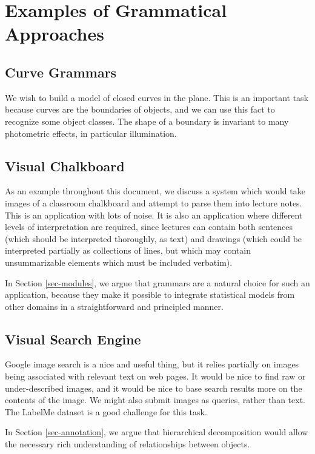 \section{Examples of Grammatical Approaches}
\label{sec-grammar-examples}

\subsection{Curve Grammars}

We wish to build a model of closed curves in the plane. This is an
important task because curves are the boundaries of objects, and we
can use this fact to recognize some object classes. The shape of a
boundary is invariant to many photometric effects, in particular
illumination. \cite{canny}

\subsection{Visual Chalkboard}

As an example throughout this document, we discuss a system which
would take images of a classroom chalkboard and attempt to parse them
into lecture notes. This is an application with lots of noise. It is
also an application where different levels of interpretation are
required, since lectures can contain both sentences (which should be
interpreted thoroughly, as text) and drawings (which could be
interpreted partially as collections of lines, but which may contain
unsummarizable elements which must be included verbatim).

In Section \ref{sec-modules}, we argue that grammars are a natural
choice for such an application, because they make it possible to
integrate statistical models from other domains in a straightforward
and principled manner.

\subsection{Visual Search Engine}

Google image search is a nice and useful thing, but it relies
partially on images being associated with relevant text on web
pages. It would be nice to find raw or under-described images, and it
would be nice to base search results more on the contents of the
image. We might also submit images as queries, rather than text. The
LabelMe dataset is a good challenge for this task.

In Section \ref{sec-annotation}, we argue that hierarchical
decomposition would allow the necessary rich understanding of
relationships between objects.

